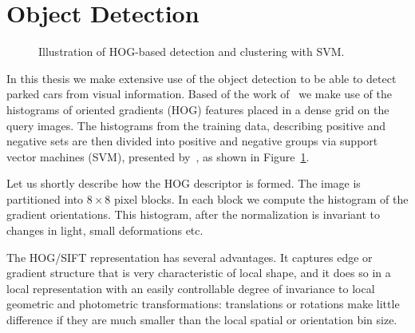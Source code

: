     \section{Object Detection}\label{sec:object_detection}
        \begin{figure}[th]%
            \centering
            \caption{Illustration of HOG-based detection and clustering with SVM.}
            \label{fig:det_to_svm}
        \end{figure}
        In this thesis we make extensive use of the object detection to be able to
        detect parked cars from visual information. Based of the work
        of~\cite{dalal2005} we make use of the histograms of oriented gradients
        (HOG) features placed in a dense grid on the query images. The histograms
        from the training data, describing positive and negative sets are then
        divided into positive and negative groups via support vector machines
        (SVM), presented by~\cite{svm2003}, as shown in Figure~\ref{fig:det_to_svm}.

        Let us shortly describe how the HOG descriptor is formed. The image is
        partitioned into $8 \times 8$ pixel blocks. In each block we compute the
        histogram of the gradient orientations. This histogram, after the
        normalization is invariant to changes in light, small deformations etc.

        The HOG/SIFT representation has several advantages. It captures edge or
        gradient structure that is very characteristic of local shape, and it does
        so in a local representation with an easily controllable degree of
        invariance to local geometric and photometric transformations:
        translations or rotations make little difference if they are much smaller
        than the local spatial or orientation bin size.


